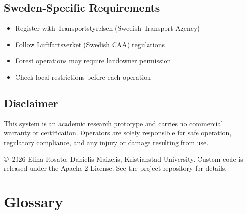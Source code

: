 \documentclass{article}
\begin{document}
\subsection{Sweden-Specific Requirements}

\begin{itemize}
    \item Register with Transportstyrelsen (Swedish Transport Agency)~\cite{transportstyrelsen}
    \item Follow Luftfartsverket (Swedish CAA) regulations
    \item Forest operations may require landowner permission
    \item Check local restrictions before each operation
\end{itemize}

\subsection{Disclaimer}

This system is an academic research prototype and carries no commercial warranty or certification. Operators are solely responsible for safe operation, regulatory compliance, and any injury or damage resulting from use.

\copyright~2026 Elina Rosato, Danielis Maizelis, Kristianstad University. Custom code is released under the Apache 2 License. See the project repository for details.

\appendix

\section{Glossary}
\end{document}
